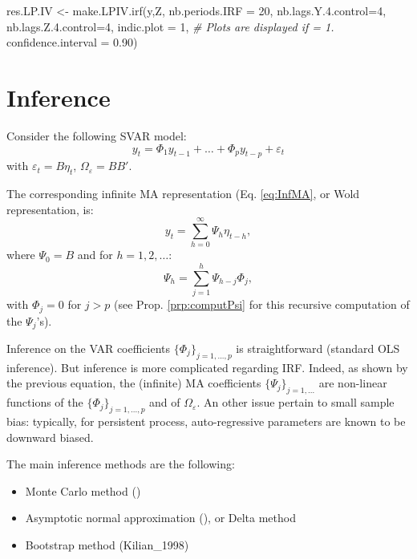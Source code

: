 \documentclass[
  12pt,
]{book}
\newenvironment{Shaded}{\begin{snugshade}}{\end{snugshade}}
\newcommand{\AttributeTok}[1]{\textcolor[rgb]{0.77,0.63,0.00}{#1}}
\newcommand{\CommentTok}[1]{\textcolor[rgb]{0.56,0.35,0.01}{\textit{#1}}}
\newcommand{\DecValTok}[1]{\textcolor[rgb]{0.00,0.00,0.81}{#1}}
\newcommand{\FloatTok}[1]{\textcolor[rgb]{0.00,0.00,0.81}{#1}}
\newcommand{\FunctionTok}[1]{\textcolor[rgb]{0.00,0.00,0.00}{#1}}
\newcommand{\NormalTok}[1]{#1}
\newcommand{\OtherTok}[1]{\textcolor[rgb]{0.56,0.35,0.01}{#1}}
\providecommand{\tightlist}{%
  \setlength{\itemsep}{0pt}\setlength{\parskip}{0pt}}
\theoremstyle{definition}
\theoremstyle{definition}
\theoremstyle{definition}
\theoremstyle{definition}
\theoremstyle{remark}
\begin{document}
\begin{Shaded}
\begin{Highlighting}[]
\NormalTok{res.LP.IV }\OtherTok{\textless{}{-}} \FunctionTok{make.LPIV.irf}\NormalTok{(y,Z,}
                           \AttributeTok{nb.periods.IRF =} \DecValTok{20}\NormalTok{,}
                           \AttributeTok{nb.lags.Y.4.control=}\DecValTok{4}\NormalTok{,}
                           \AttributeTok{nb.lags.Z.4.control=}\DecValTok{4}\NormalTok{,}
                           \AttributeTok{indic.plot =} \DecValTok{1}\NormalTok{, }\CommentTok{\# Plots are displayed if = 1.}
                           \AttributeTok{confidence.interval =} \FloatTok{0.90}\NormalTok{)}
\end{Highlighting}
\end{Shaded}

\hypertarget{Inference}{%
\chapter{Inference}\label{Inference}}

Consider the following SVAR model:
\[y_t = \Phi_1 y_{t-1} + \dots + \Phi_p y_{t-p} + \varepsilon_t\]
with \(\varepsilon_t=B\eta_t\), \(\Omega_\varepsilon=BB'\).

The corresponding infinite MA representation (Eq. \eqref{eq:InfMA}, or Wold representation, is:
\[
y_t = \sum_{h=0}^\infty\Psi_h \eta_{t-h},
\]
where \(\Psi_0=B\) and for \(h=1,2,\dots\):
\[
\Psi_h = \sum_{j=1}^h\Psi_{h-j}\Phi_j,
\]
with \(\Phi_j=0\) for \(j>p\) (see Prop. \ref{prp:computPsi} for this recursive computation of the \(\Psi_j\)'s).

Inference on the VAR coefficients \(\{\Phi_j\}_{j=1,...,p}\) is straightforward (standard OLS inference). But inference is more complicated regarding IRF. Indeed, as shown by the previous equation, the (infinite) MA coefficients \(\{\Psi_j\}_{j=1,...}\) are non-linear functions of the \(\{\Phi_j\}_{j=1,...,p}\) and of \(\Omega_\varepsilon\). An other issue pertain to small sample bias: typically, for persistent process, auto-regressive parameters are known to be downward biased.

The main inference methods are the following:

\begin{itemize}
\tightlist
\item
  Monte Carlo method (\citet{Hamilton_1994})
\item
  Asymptotic normal approximation (\citet{Lutkepohl_1990}), or Delta method
\item
  Bootstrap method (Kilian\_1998)
\end{itemize}
\end{document}
